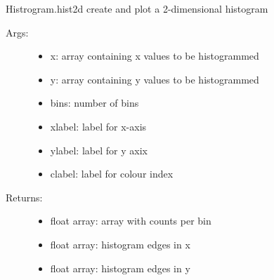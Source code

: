 \documentclass[letterpaper,10pt,english]{sphinxmanual}
\begin{document}
\begin{fulllineitems}
\label{\detokenize{index:PhyPraKit.PhyPraKit.nhist2d}}
Histrogram.hist2d
create and plot a 2-dimensional histogram
\begin{description}
\item[{Args:}] \leavevmode\begin{itemize}
\item {} 
x: array containing x values to be histogrammed

\item {} 
y: array containing y values to be histogrammed

\item {} 
bins: number of bins

\item {} 
xlabel: label for x-axis

\item {} 
ylabel: label for y axix

\item {} 
clabel: label for colour index

\end{itemize}

\item[{Returns:}] \leavevmode\begin{itemize}
\item {} 
float array: array with counts per bin

\item {} 
float array: histogram edges in x

\item {} 
float array: histogram edges in y

\end{itemize}

\end{description}

\end{fulllineitems}

\end{document}
